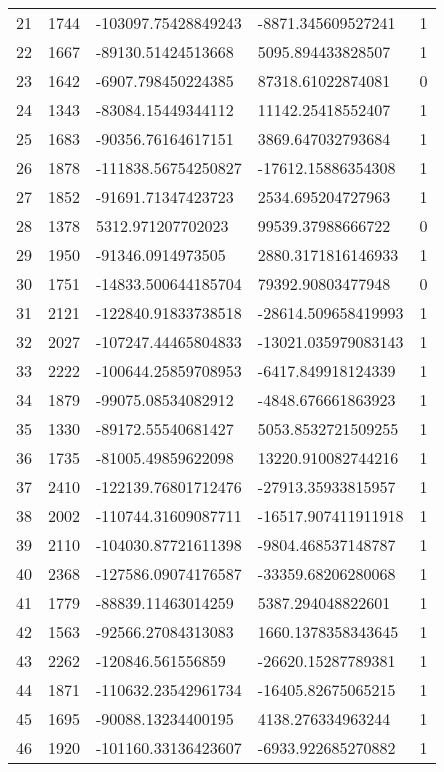 \begin{longtable}{lllll}
    21 & 1744 & -103097.75428849243 & -8871.345609527241 & 1 \\
    22 & 1667 & -89130.51424513668 & 5095.894433828507 & 1 \\
    23 & 1642 & -6907.798450224385 & 87318.61022874081 & 0 \\
    24 & 1343 & -83084.15449344112 & 11142.25418552407 & 1 \\
    25 & 1683 & -90356.76164617151 & 3869.647032793684 & 1 \\
    26 & 1878 & -111838.56754250827 & -17612.15886354308 & 1 \\
    27 & 1852 & -91691.71347423723 & 2534.695204727963 & 1 \\
    28 & 1378 & 5312.971207702023 & 99539.37988666722 & 0 \\
    29 & 1950 & -91346.0914973505 & 2880.3171816146933 & 1 \\
    30 & 1751 & -14833.500644185704 & 79392.90803477948 & 0 \\
    31 & 2121 & -122840.91833738518 & -28614.509658419993 & 1 \\
    32 & 2027 & -107247.44465804833 & -13021.035979083143 & 1 \\
    33 & 2222 & -100644.25859708953 & -6417.849918124339 & 1 \\
    34 & 1879 & -99075.08534082912 & -4848.676661863923 & 1 \\
    35 & 1330 & -89172.55540681427 & 5053.8532721509255 & 1 \\
    36 & 1735 & -81005.49859622098 & 13220.910082744216 & 1 \\
    37 & 2410 & -122139.76801712476 & -27913.35933815957 & 1 \\
    38 & 2002 & -110744.31609087711 & -16517.907411911918 & 1 \\
    39 & 2110 & -104030.87721611398 & -9804.468537148787 & 1 \\
    40 & 2368 & -127586.09074176587 & -33359.68206280068 & 1 \\
    41 & 1779 & -88839.11463014259 & 5387.294048822601 & 1 \\
    42 & 1563 & -92566.27084313083 & 1660.1378358343645 & 1 \\
    43 & 2262 & -120846.561556859 & -26620.15287789381 & 1 \\
    44 & 1871 & -110632.23542961734 & -16405.82675065215 & 1 \\
    45 & 1695 & -90088.13234400195 & 4138.276334963244 & 1 \\
    46 & 1920 & -101160.33136423607 & -6933.922685270882 & 1 \\

\end{longtable}
